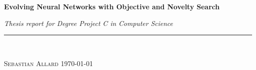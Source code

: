 
\vspace*{5cm}

\begin{flushleft}
\Huge \textsf{\textbf{Evolving Neural Networks with Objective and Novelty Search}}
\end{flushleft}

\emph{\large Thesis report for Degree Project C in Computer Science} \hfill \\
\rule{\textwidth}{1pt} \\

\begin{flushright}
\textsc{Sebastian Allard} \quad \today
\end{flushright}


\thispagestyle{empty}
